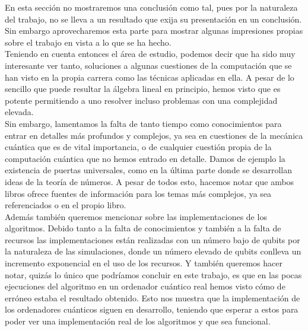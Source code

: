 \documentclass[a4paper]{article}
\numberwithin{equation}{section}
\begin{document}
En esta sección no mostraremos una conclusión como tal, pues por la naturaleza del trabajo, no se lleva a un resultado que exija su presentación en un conclusión.\\
Sin embargo aprovecharemos esta parte para mostrar algunas impresiones propias sobre el trabajo en vista a lo que se ha hecho.\\
\linebreak
Teniendo en cuenta entonces el área de estudio, podemos decir que ha sido muy interesante ver tanto, soluciones a algunas cuestiones de la computación que se han visto en la propia carrera como las técnicas aplicadas en ella. A pesar de lo sencillo que puede resultar la álgebra lineal en principio, hemos visto que es potente permitiendo a uno resolver incluso problemas con una complejidad elevada.\\
\linebreak
Sin embargo, lamentamos la falta de tanto tiempo como conocimientos para entrar en detalles más profundos y complejos, ya sea en cuestiones de la mecánica cuántica que es de vital importancia, o de cualquier cuestión propia de la computación cuántica que no hemos entrado en detalle. Damos de ejemplo la existencia de puertas universales, como en la última parte donde se desarrollan ideas de la teoría de números. A pesar de todos esto, hacemos notar que ambos libros ofrece fuentes de información para los temas más complejos, ya sea referenciados o en el propio libro.\\
\linebreak
Además también queremos mencionar sobre las implementaciones de los algoritmos. Debido tanto a la falta de conocimientos y también a la falta de recursos las implementaciones están realizadas con un número bajo de qubits por la naturaleza de las simulaciones, donde un número elevado de qubits conlleva un incremento exponencial en el uso de los recursos. Y también queremos hacer notar, quizás lo único que podríamos concluir en este trabajo, es que en las pocas ejecuciones del algoritmo en un ordenador cuántico real hemos visto cómo de erróneo estaba el resultado obtenido. Esto nos muestra que la implementación de los ordenadores cuánticos siguen en desarrollo, teniendo que esperar a estos para poder ver una implementación real de los algoritmos y que sea funcional.\\

\newpage


\nocite{*}



\end{document}
